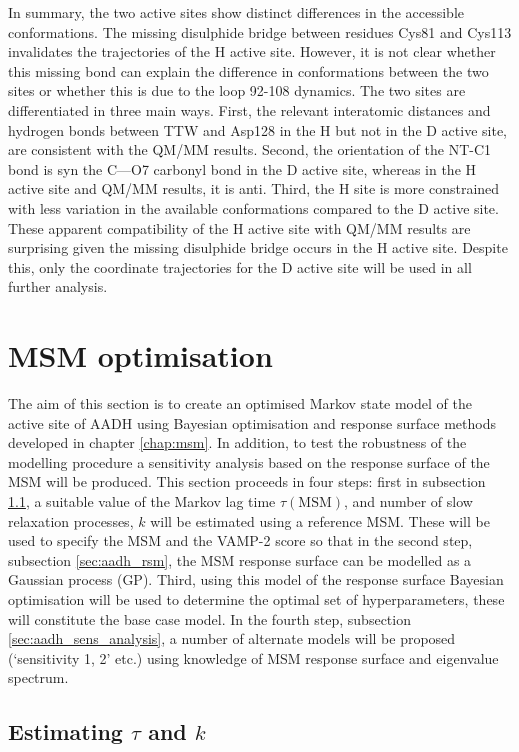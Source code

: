 In summary, the two active sites show distinct differences in the accessible conformations. The missing disulphide bridge between residues Cys81 and Cys113 invalidates the trajectories of the H active site. However, it is not clear whether this missing bond can explain the difference in conformations between the two sites or whether this is due to the loop 92-108 dynamics. The two sites are differentiated in three main ways. First, the relevant interatomic distances and hydrogen bonds between TTW and Asp128 in the H but not in the D active site, are consistent with the QM/MM results. Second, the orientation of the NT-C1 bond is syn the C---O7 carbonyl bond in the D active site, whereas in the H active site and QM/MM results, it is anti. Third, the H site is more constrained with less variation in the available conformations compared to the  D active site. These apparent compatibility of the H active site with QM/MM results are surprising given the missing disulphide bridge occurs in the H active site. Despite this, only the  coordinate trajectories for the D active site will be used in all further analysis.  

\section{MSM optimisation}\label{sec:aadh_optimisation}

The aim of this section is to create an optimised Markov state model of the active site of AADH using Bayesian optimisation and response surface methods developed in chapter \ref{chap:msm}. In addition, to test the robustness of the modelling procedure a sensitivity analysis based on the response surface of the MSM will be produced. This section proceeds in four steps: first in subsection \ref{sec:aadh_est_tau_k}, a suitable  value of the Markov lag time $\tau(\mathrm{MSM})$, and number of slow relaxation processes, $k$ will be estimated using a reference MSM. These will be used to specify the MSM and the VAMP-2 score so that in the second step, subsection \ref{sec:aadh_rsm},  the MSM response surface can be modelled as a Gaussian process (GP). Third, using this model of the response surface Bayesian optimisation will be used to determine the optimal set of hyperparameters, these will constitute the base case model.  In the fourth step, subsection \ref{sec:aadh_sens_analysis}, a number of alternate models will be proposed (`sensitivity 1, 2' etc.)  using knowledge of MSM response surface and eigenvalue spectrum.  

\subsection{Estimating $\tau$ and $k$}\label{sec:aadh_est_tau_k}

